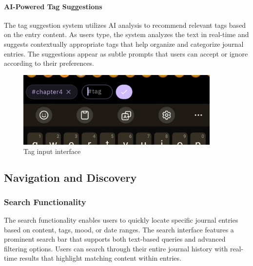\paragraph{AI-Powered Tag Suggestions}

The tag suggestion system utilizes AI analysis to recommend relevant tags based on the entry content. As users type, the system analyzes the text in real-time and suggests contextually appropriate tags that help organize and categorize journal entries. The suggestions appear as subtle prompts that users can accept or ignore according to their preferences.

\begin{figure}[H]
\centering
\begin{minipage}{0.45\textwidth}
\centering
\includegraphics[width=0.9\textwidth]{files/imgs/prototype/tag_input.jpeg}
\caption{Tag input interface}
\label{fig:tag-input}
\end{minipage}
\hfill
\end{figure}

\subsection{Navigation and Discovery}

\subsubsection{Search Functionality}

The search functionality enables users to quickly locate specific journal entries based on content, tags, mood, or date ranges. The search interface features a prominent search bar that supports both text-based queries and advanced filtering options. Users can search through their entire journal history with real-time results that highlight matching content within entries.

